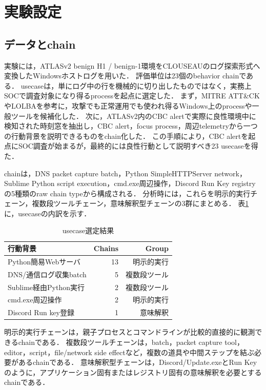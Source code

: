 \documentclass[dvipdfmx]{FITpaper}
\begin{document}
\section{実験設定}

\subsection{データとchain}

実験には，ATLASv2 benign H1 / benign-1環境をCLOUSEAUのログ探索形式へ変換したWindowsホストログを用いた．
評価単位は23個のbehavior chainである．
usecaseは，単にログ中の行を機械的に切り出したものではなく，実務上SOCで調査対象になり得るprocessを起点に選定した．
まず，MITRE ATT\&CKやLOLBAを参考に，攻撃でも正常運用でも使われ得るWindows上のprocessや一般ツールを候補化した．
次に，ATLASv2内のCBC alertで実際に良性環境中に検知された時刻窓を抽出し，CBC alert，focus process，周辺telemetryから一つの行動背景を説明できるものをchain化した．
この手順により，CBC alertを起点にSOC調査が始まるが，最終的には良性行動として説明すべき23 usecaseを得た．

chainは，DNS packet capture batch，Python SimpleHTTPServer network，Sublime Python script execution，cmd.exe周辺操作，Discord Run Key registryの5種類のraw chain typeから構成される．
分析時には，これらを明示的実行チェーン，複数段ツールチェーン，意味解釈型チェーンの3群にまとめる．
表\ref{table:usecases}に，usecaseの内訳を示す．

\begin{table}[ht]
    \centering
    \caption{usecase選定結果}
    \label{table:usecases}
    \begin{tabular}{lrr}
        \toprule
        行動背景 & Chains & Group \\
        \midrule
        Python簡易Webサーバ & 13 & 明示的実行 \\
        DNS/通信ログ収集batch & 5 & 複数段ツール \\
        Sublime経由Python実行 & 2 & 複数段ツール \\
        cmd.exe周辺操作 & 2 & 明示的実行 \\
        Discord Run key登録 & 1 & 意味解釈 \\
        \bottomrule
    \end{tabular}
\end{table}

明示的実行チェーンは，親子プロセスとコマンドラインが比較的直接的に観測できるchainである．
複数段ツールチェーンは，batch，packet capture tool，editor，script，file/network side effectなど，複数の道具や中間ステップを結ぶ必要があるchainである．
意味解釈型チェーンは，Discord/Update.exeとRun Keyのように，アプリケーション固有またはレジストリ固有の意味解釈を必要とするchainである．
\end{document}
